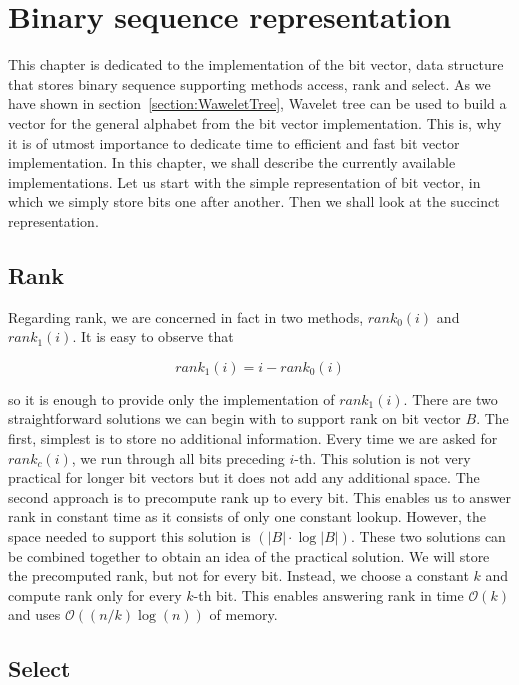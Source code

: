 \chapter{Binary sequence representation}
\label{kap:kap2}

This chapter is dedicated to the implementation of the bit vector, data structure that
stores binary sequence supporting methods access, rank and select. As we have shown in
section~\ref{section:WaweletTree}, Wavelet tree can be used to build a vector for the
general alphabet from the bit vector implementation. This is, why it is of utmost
importance to dedicate time to efficient and fast bit vector implementation. In this
chapter, we shall describe the currently available implementations. Let us start with
the simple representation of bit vector, in which we simply store bits one after another.
Then we shall look at the succinct representation.

\section{Rank}
\label{section:rank}

Regarding rank, we are concerned in fact in two methods, $rank_0(i)$ and $rank_1(i)$. It is
easy to observe that

                    $$rank_1(i) = i - rank_0(i)$$

so it is enough to provide only the implementation of $rank_1(i)$.
There are two straightforward solutions we can begin with to support rank on bit vector
$B$. The first, simplest is to store no additional information. Every time we are asked
for $rank_c(i)$, we run through all bits preceding $i$-th. This solution is not very
practical for longer bit vectors but it does not add any additional space. The second
approach is to precompute rank up to every bit. This enables us to answer rank in constant
time as it consists of only one constant lookup. However, the space needed to support this
solution is $(|B|\cdot\log |B|)$. These two solutions can be combined together to obtain an idea
of the practical solution. We will store the precomputed rank, but not for every bit. Instead, we
choose a constant $k$ and compute rank only for every $k$-th bit. This enables answering rank
in time $\mathcal{O}(k)$ and uses $\mathcal{O}((n/k)\log(n))$ of memory.

\section{Select}


